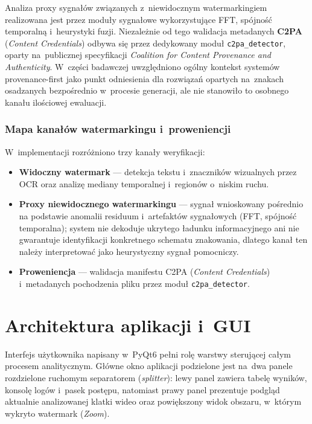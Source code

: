 Analiza proxy sygnałów związanych z~niewidocznym watermarkingiem
realizowana jest przez moduły sygnałowe wykorzystujące FFT, spójność
temporalną i~heurystyki fuzji. Niezależnie od tego walidacja metadanych
\textbf{C2PA} (\textit{Content Credentials}) odbywa się przez dedykowany
moduł \texttt{c2pa\_detector}, oparty na~publicznej specyfikacji
\textit{Coalition for Content Provenance and Authenticity}. W~części
badawczej uwzględniono ogólny kontekst systemów provenance-first jako
punkt odniesienia dla rozwiązań opartych na~znakach osadzanych
bezpośrednio w~procesie generacji, ale nie stanowiło to osobnego
kanału ilościowej ewaluacji.

\subsubsection*{Mapa kanałów watermarkingu i~proweniencji}
W~implementacji rozróżniono trzy kanały weryfikacji:
\begin{itemize}
  \item \textbf{Widoczny watermark} --- detekcja tekstu i~znaczników wizualnych
    przez OCR oraz analizę mediany temporalnej i~regionów o~niskim ruchu.
  \item \textbf{Proxy niewidocznego watermarkingu} --- sygnał wnioskowany pośrednio na podstawie anomalii residuum i~artefaktów sygnałowych
    (FFT, spójność temporalna); system nie dekoduje ukrytego ładunku informacyjnego
    ani nie gwarantuje identyfikacji konkretnego schematu znakowania, dlatego kanał ten należy interpretować jako heurystyczny sygnał pomocniczy.
  \item \textbf{Proweniencja} --- walidacja manifestu C2PA
    (\textit{Content Credentials}) i~metadanych pochodzenia pliku przez moduł \texttt{c2pa\_detector}.
\end{itemize}

\section{Architektura aplikacji i~GUI}

Interfejs użytkownika napisany w~PyQt6 pełni rolę warstwy sterującej
całym procesem analitycznym. Główne okno aplikacji podzielone jest
na~dwa panele rozdzielone ruchomym separatorem (\textit{splitter}): lewy panel
zawiera tabelę wyników, konsolę logów i~pasek postępu,
natomiast prawy panel prezentuje podgląd aktualnie analizowanej klatki wideo
oraz powiększony widok obszaru, w~którym wykryto watermark (\textit{Zoom}).

